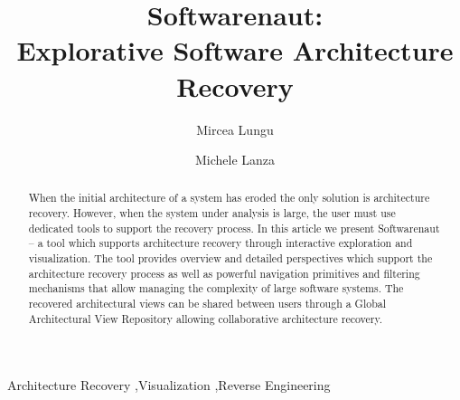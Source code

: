 \documentclass[preprint,12pt]{elsarticle}
\begin{document}
\begin{frontmatter}



\title{Softwarenaut:\\ Explorative Software Architecture Recovery}



\author{Mircea Lungu}
\address{Software Composition Group - University of Bern, Switzerland}

\author{Michele Lanza}
\address{REVEAL @ Faculty of Informatics - University of Lugano, Switzerland}


\begin{abstract}
When the initial architecture of a system has eroded the only solution is architecture recovery. However, when the system under analysis is large, the user must use dedicated tools to support the recovery process. In this article we present Softwarenaut -- a tool which supports architecture recovery through interactive exploration and visualization. The tool provides overview and detailed perspectives which support the architecture recovery process as well as powerful navigation primitives and filtering mechanisms that allow managing the complexity of large software systems. The recovered architectural views can be shared between users through a Global Architectural View Repository allowing collaborative architecture recovery.
\end{abstract}

\begin{keyword}
Architecture Recovery \sep Visualization \sep Reverse Engineering
\end{keyword}

\end{frontmatter}
\end{document}
